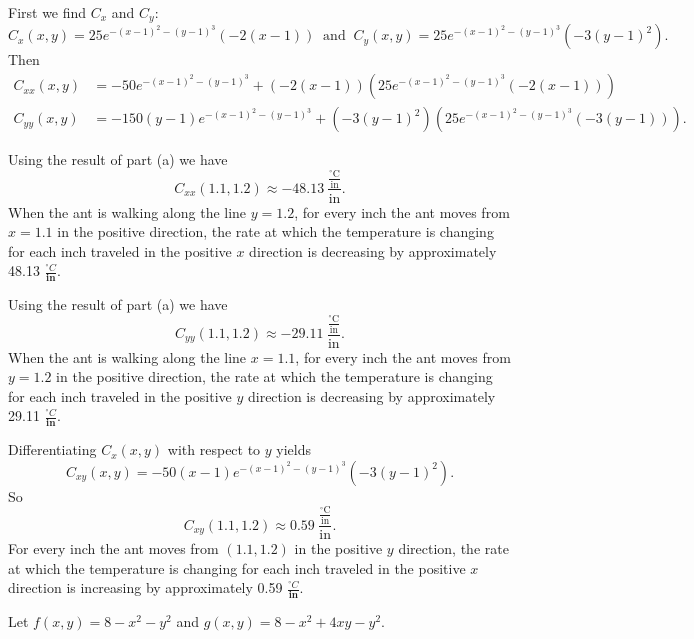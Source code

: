 \begin{exercises}
\ea


\begin{exerciseSolution}
\ba

	\item First we find $C_x$ and $C_y$:
\[C_x(x,y) = 25e^{-(x-1)^2 - (y-1)^3}\left(-2(x-1)\right) \ \text{ and } \ C_y(x,y) = 25e^{-(x-1)^2 - (y-1)^3}\left(-3(y-1)^2\right).\]
Then
\begin{align*}
C_{xx}(x,y) &= -50e^{-(x-1)^2 - (y-1)^3} + \left(-2(x-1)\right)\left(25e^{-(x-1)^2 - (y-1)^3}\left(-2(x-1)\right)\right) \\
C_{yy}(x,y) &= -150(y-1)e^{-(x-1)^2 - (y-1)^3} + \left(-3(y-1)^2\right)\left(25e^{-(x-1)^2 - (y-1)^3}\left(-3(y-1)\right)\right).
\end{align*}


	\item Using the result of part (a) we have 
\[C_{xx}(1.1, 1.2) \approx -48.13 \ \frac{\frac{^{\circ}\text{C}}{\text{in}}}{\text{in}}.\]
When the ant is walking along the line $y=1.2$, for every inch the ant moves from $x=1.1$ in the positive direction, the rate at which the temperature is changing for each inch traveled in the positive $x$ direction is decreasing by approximately 48.13 $\frac{^{\circ}C}{\textbf{in}}$. 

	\item Using the result of part (a) we have 
\[C_{yy}(1.1, 1.2) \approx -29.11 \ \frac{\frac{^{\circ}\text{C}}{\text{in}}}{\text{in}}.\]
When the ant is walking along the line $x=1.1$, for every inch the ant moves from $y=1.2$ in the positive direction, the rate at which the temperature is changing for each inch traveled in the positive $y$ direction is decreasing by approximately 29.11 $\frac{^{\circ}C}{\textbf{in}}$. 
	
	\item Differentiating $C_x(x,y)$ with respect to $y$ yields
\[C_{xy}(x,y) = -50(x-1)e^{-(x-1)^2 - (y-1)^3}\left(-3(y-1)^2\right).\]
So
\[C_{xy}(1.1, 1.2) \approx 0.59 \ \frac{\frac{^{\circ}\text{C}}{\text{in}}}{\text{in}}.\]
For every inch the ant moves from $(1.1,1.2)$ in the positive $y$ direction, the rate at which the temperature is changing for each inch traveled in the positive $x$ direction is increasing by approximately 0.59 $\frac{^{\circ}C}{\textbf{in}}$. 


\ea


\end{exerciseSolution}



\item \label{Ez:10.3.3}  Let $f(x,y) = 8 - x^2 - y^2$ and $g(x,y) = 8 - x^2 + 4xy - y^2$.
				

\end{exercises}
